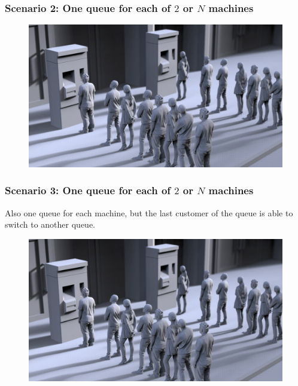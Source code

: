 \documentclass{beamer}
\begin{document}
\begin{frame}
\frametitle{Scenario 2: One queue for each of $2$ or $N$ machines}
\begin{figure}
\centering
\includegraphics[width=1\textwidth]{images/scenario2.png}
\end{figure}
\end{frame}

\begin{frame}
\frametitle{Scenario 3: One queue for each of $2$ or $N$ machines}
Also one queue for each machine, but the last customer of the queue is able to switch to another queue.
\begin{figure}
\centering
\includegraphics[width=1\textwidth]{images/scenario2.png}
\end{figure}
\end{frame}
\end{document}
